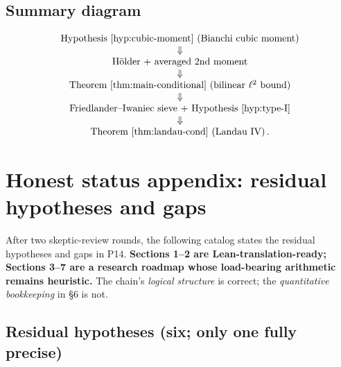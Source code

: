 \documentclass[11pt]{article}
\theoremstyle{definition}
\begin{document}
\subsection{Summary diagram}\label{ssec:summary}

\[
\begin{array}{c}
\text{Hypothesis~\ref{hyp:cubic-moment} (Bianchi cubic moment)}\\
\Downarrow\\
\text{Hölder + averaged 2nd moment}\\
\Downarrow\\
\text{Theorem~\ref{thm:main-conditional} (bilinear $\ell^2$ bound)}\\
\Downarrow\\
\text{Friedlander--Iwaniec sieve + Hypothesis~\ref{hyp:type-I}}\\
\Downarrow\\
\text{Theorem~\ref{thm:landau-cond} (Landau IV)}\,.
\end{array}
\]


\section*{Honest status appendix: residual hypotheses and gaps}\label{sec:status}

After two skeptic-review rounds, the following catalog states the residual hypotheses and gaps in P14. \textbf{Sections 1--2 are Lean-translation-ready; Sections 3--7 are a research roadmap whose load-bearing arithmetic remains heuristic.} The chain's \emph{logical structure} is correct; the \emph{quantitative bookkeeping} in §6 is not.

\subsection*{Residual hypotheses (six; only one fully precise)}
\end{document}
